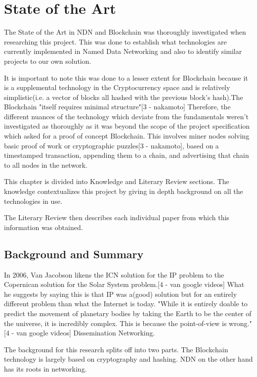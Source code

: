 \chapter{State of the Art}
The State of the Art in NDN and Blockchain was thoroughly investigated when researching this project. This was done to establish what technologies are currently implemented in Named Data Networking and also to identify similar projects to our own solution.\par It is important to note this was done to a lesser extent for Blockchain because it is a supplemental technology in the Cryptocurrency space and is relatively simplistic(i.e. a vector of blocks all hashed with the previous block's hash).The Blockchain "itself requires minimal structure"[3 - nakamoto] Therefore, the different nuances of the technology which deviate from the fundamentals weren't investigated as thoroughly as it was beyond the scope of the project specification which asked for a proof of concept Blockchain. This involves miner nodes solving basic proof of work or cryptographic puzzles[3 - nakamoto], based on a timestamped transaction, appending them to a chain, and advertising that chain to all nodes in the network. 

This chapter is divided into Knowledge and Literary Review sections. The knowledge contextualizes this project by giving in depth background on all the technologies in use. 

The Literary Review then describes each individual paper from which this information was obtained. 

\section{Background and Summary}
In 2006, Van Jacobson likens the ICN solution for the IP problem to the Copernican solution for the Solar System problem.[4 - van google videos] What he suggests by saying this is that IP was a(good) solution but for an entirely different problem than what the Internet is today. "While it is entirely doable to predict the movement of planetary bodies by taking the Earth to be the center of the universe, it is incredibly complex. This is because the point-of-view is wrong." [4 - van google videos] Dissemination Networking.

The background for this research splits off into two parts. The Blockchain technology is largely based on cryptography and hashing. NDN on the other hand has its roots in networking. 

